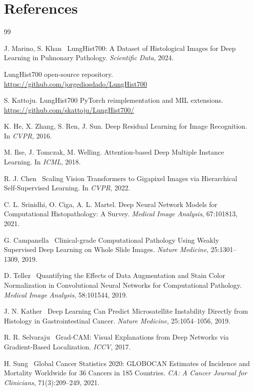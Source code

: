 \documentclass[10pt,twocolumn,letterpaper]{article}
\begin{document}
\section*{References}
\begin{thebibliography}{99}

J. Marino, S. Khan \etal\
LungHist700: A Dataset of Histological Images for Deep Learning in Pulmonary Pathology.
\textit{Scientific Data}, 2024.

LungHist700 open-source repository.
\url{https://github.com/jorgediosdado/LungHist700}

S. Kattoju. LungHist700 PyTorch reimplementation and MIL extensions.
\url{https://github.com/skattoju/LungHist700/}

K. He, X. Zhang, S. Ren, J. Sun.
Deep Residual Learning for Image Recognition.
In \textit{CVPR}, 2016.

M. Ilse, J. Tomczak, M. Welling.
Attention-based Deep Multiple Instance Learning.
In \textit{ICML}, 2018.

R. J. Chen \etal\
Scaling Vision Transformers to Gigapixel Images via Hierarchical Self-Supervised Learning.
In \textit{CVPR}, 2022.

C. L. Srinidhi, O. Ciga, A. L. Martel.
Deep Neural Network Models for Computational Histopathology: A Survey.
\textit{Medical Image Analysis}, 67:101813, 2021.

G. Campanella \etal\
Clinical-grade Computational Pathology Using Weakly Supervised Deep Learning on Whole Slide Images.
\textit{Nature Medicine}, 25:1301–1309, 2019.

\bibitem{tellez2019}
D. Tellez \etal\
Quantifying the Effects of Data Augmentation and Stain Color Normalization in Convolutional Neural Networks for Computational Pathology.
\textit{Medical Image Analysis}, 58:101544, 2019.

J. N. Kather \etal\
Deep Learning Can Predict Microsatellite Instability Directly from Histology in Gastrointestinal Cancer.
\textit{Nature Medicine}, 25:1054–1056, 2019.

\bibitem{gradcam}
R. R. Selvaraju \etal\
Grad-CAM: Visual Explanations from Deep Networks via Gradient-Based Localization.
\textit{ICCV}, 2017.

H. Sung \etal\
Global Cancer Statistics 2020: GLOBOCAN Estimates of Incidence and Mortality Worldwide for 36 Cancers in 185 Countries.
\textit{CA: A Cancer Journal for Clinicians}, 71(3):209–249, 2021.

\end{thebibliography}
\end{document}
